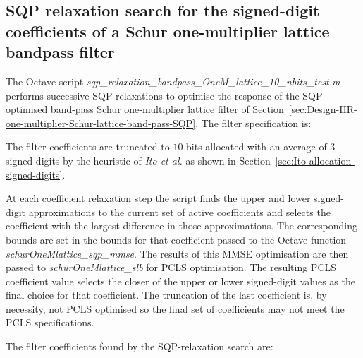 \documentclass[a4paper,twoside,10pt,english]{report}
\begin{document}
\subsection{\label{sec:SQP-relaxation-search-signed-digit-coefficients-bandpass}SQP relaxation search for the signed-digit coefficients of a Schur one-multiplier lattice bandpass filter}
The Octave script 
\emph{sqp\_relaxation\_bandpass\_OneM\_lattice\_10\_nbits\_test.m} performs
successive SQP relaxations to optimise the response of the SQP optimised
band-pass Schur one-multiplier lattice filter of
Section~\ref{sec:Design-IIR-one-multiplier-Schur-lattice-band-pass-SQP}. The 
filter specification is:
\begin{small}

\end{small} 
The filter coefficients are truncated to $10$ bits allocated with an average of
$3$ signed-digits by the heuristic of \emph{Ito et al.} as shown in
Section~\ref{sec:Ito-allocation-signed-digits}. 

At each coefficient relaxation step the script finds the upper and lower
signed-digit approximations to the current set of active coefficients and
selects the coefficient with the largest difference in those approximations. The
corresponding bounds are set in the bounds for that coefficient passed to the
Octave function \emph{schurOneMlattice\_sqp\_mmse}. The results of this MMSE
optimisation are then passed to \emph{schurOneMlattice\_slb} for PCLS
optimisation. The resulting PCLS coefficient value selects the closer of the
upper or lower signed-digit values as the final choice for that coefficient. The
truncation of the last coefficient is, by necessity, not PCLS optimised so the
final set of coefficients may not meet the PCLS specifications.

The filter coefficients found by the SQP-relaxation search are:
\begin{small}


\end{small}
\end{document}
